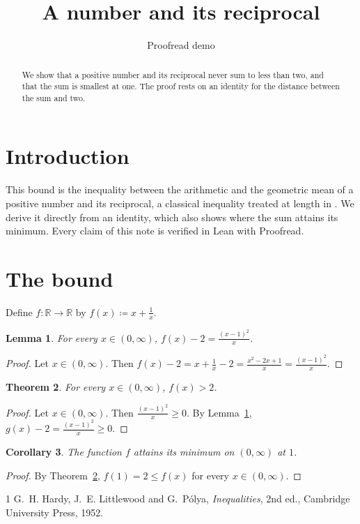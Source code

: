 \documentclass{article}
\title{A number and its reciprocal}
\author{Proofread demo}
\date{}
\newtheorem{lemma}{Lemma}
\newtheorem{theorem}[lemma]{Theorem}
\newtheorem{corollary}[lemma]{Corollary}
\begin{document}
\maketitle

\begin{abstract}
We show that a positive number and its reciprocal never sum to less than two, and that the sum is smallest at one.
The proof rests on an identity for the distance between the sum and two.
\end{abstract}

\section{Introduction}

This bound is the inequality between the arithmetic and the geometric mean of a positive number and its reciprocal, a classical inequality treated at length in \cite{hardy1952inequalities}.
We derive it directly from an identity, which also shows where the sum attains its minimum.
Every claim of this note is verified in Lean with Proofread.

\section{The bound}

Define $f:\mathbb{R}\to\mathbb{R}$ by $f(x)\coloneqq x+\frac1x$.

\begin{lemma}\label{lem:identity}
For every $x\in(0,\infty)$, $f(x)-2=\frac{(x-1)^2}{x}$.
\end{lemma}

\begin{proof}
Let $x\in(0,\infty)$.
Then $f(x)-2=x+\frac1x-2=\frac{x^2-2x+1}{x}=\frac{(x-1)^2}{x}$.
\end{proof}

\begin{theorem}\label{thm:bound}
For every $x\in(0,\infty)$, $f(x)>2$.
\end{theorem}

\begin{proof}
Let $x\in(0,\infty)$.
Then $\frac{(x-1)^2}{x}\ge0$.
By Lemma~\ref{lem:identity}, $g(x)-2=\frac{(x-1)^2}{x}\ge0$.
\end{proof}

\begin{corollary}\label{cor:min}
The function $f$ attains its minimum on $(0,\infty)$ at $1$.
\end{corollary}

\begin{proof}
By Theorem~\ref{thm:bound}, $f(1)=2\le f(x)$ for every $x\in(0,\infty)$.
\end{proof}

\begin{thebibliography}{1}
 G.~H. Hardy, J.~E. Littlewood and G.~P\'olya, \emph{Inequalities}, 2nd ed., Cambridge University Press, 1952.
\end{thebibliography}
\end{document}
